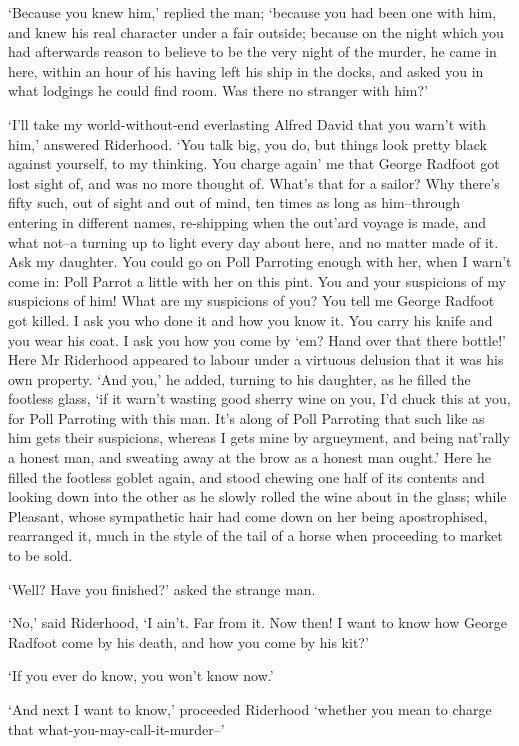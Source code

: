 ‘Because you knew him,’ replied the man; ‘because you had been one with
him, and knew his real character under a fair outside; because on the
night which you had afterwards reason to believe to be the very night of
the murder, he came in here, within an hour of his having left his ship
in the docks, and asked you in what lodgings he could find room. Was
there no stranger with him?’

‘I’ll take my world-without-end everlasting Alfred David that you warn’t
with him,’ answered Riderhood. ‘You talk big, you do, but things look
pretty black against yourself, to my thinking. You charge again’ me that
George Radfoot got lost sight of, and was no more thought of. What’s
that for a sailor? Why there’s fifty such, out of sight and out of
mind, ten times as long as him--through entering in different names,
re-shipping when the out’ard voyage is made, and what not--a turning
up to light every day about here, and no matter made of it. Ask my
daughter. You could go on Poll Parroting enough with her, when I warn’t
come in: Poll Parrot a little with her on this pint. You and your
suspicions of my suspicions of him! What are my suspicions of you? You
tell me George Radfoot got killed. I ask you who done it and how you
know it. You carry his knife and you wear his coat. I ask you how you
come by ‘em? Hand over that there bottle!’ Here Mr Riderhood appeared
to labour under a virtuous delusion that it was his own property. ‘And
you,’ he added, turning to his daughter, as he filled the footless
glass, ‘if it warn’t wasting good sherry wine on you, I’d chuck this at
you, for Poll Parroting with this man. It’s along of Poll Parroting
that such like as him gets their suspicions, whereas I gets mine by
argueyment, and being nat’rally a honest man, and sweating away at the
brow as a honest man ought.’ Here he filled the footless goblet again,
and stood chewing one half of its contents and looking down into the
other as he slowly rolled the wine about in the glass; while Pleasant,
whose sympathetic hair had come down on her being apostrophised,
rearranged it, much in the style of the tail of a horse when proceeding
to market to be sold.

‘Well? Have you finished?’ asked the strange man.

‘No,’ said Riderhood, ‘I ain’t. Far from it. Now then! I want to know
how George Radfoot come by his death, and how you come by his kit?’

‘If you ever do know, you won’t know now.’

‘And next I want to know,’ proceeded Riderhood ‘whether you mean to
charge that what-you-may-call-it-murder--’

